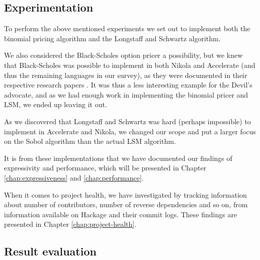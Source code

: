 \subsection{Experimentation}




To perform the above mentioned experiments we set out to implement
both the binomial pricing algorithm and the Longstaff and Schwartz
algorithm. 

We also considered the Black-Scholes option pricer a possibility, but
we knew that Black-Scholes was possible to implement in both Nikola
and Accelerate (and thus the remaining languages in our survey), as
they were documented in their respective research papers
\cite{mainland2010nikola, chakravarty2011accelerating}. It was thus a
less interesting example for the Devil's advocate, and as we had
enough work in implementing the binomial pricer and LSM, we ended up
leaving it out.

As we discovered that Longstaff and Schwartz was hard (perhaps
impossible) to implement in Accelerate and Nikola, we changed our
scope and put a larger focus on the Sobol algorithm than the actual
LSM algorithm.

It is from these implementations that we have documented our findings
of expressivity and performance, which will be presented in Chapter
\ref{chap:expressiveness} and \ref{chap:performance}. 

When it comes to project health, we have investigated by tracking
information about number of contributors, number of reverse
dependencies and so on, from information available on Hackage and
their commit logs. These findings are presented in Chapter
\ref{chap:project-health}.

\subsection{Result evaluation}



